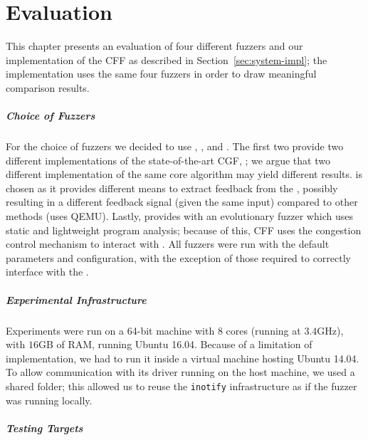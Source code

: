 \chapter{Evaluation}
\label{chap:evaluation}


This chapter presents an evaluation of four different fuzzers and our
implementation of the \acf{CFF} as described in Section~\ref{sec:system-impl};
the implementation uses the same four fuzzers in order to draw meaningful
comparison results.

\paragraph{Choice of Fuzzers}

For the choice of fuzzers we decided to use \aflfast, \fairfuzz, \honggfuzz\@
and \vuzzer. The first two provide two different implementations of the
state-of-the-art \ac{CGF}, \afl; we argue that two different implementation of
the same core algorithm may yield different results. \honggfuzz\@ is chosen as
it provides different means to extract feedback from the \sut, possibly
resulting in a different feedback signal (given the same input) compared to
other methods (\eg\@ \afl\@ uses QEMU). Lastly, \vuzzer\@ provides with an
evolutionary fuzzer which uses static and lightweight program analysis; because
of this, \ac{CFF} uses the congestion control mechanism to interact with
\vuzzer. All fuzzers were run with the default parameters and configuration,
with the exception of those required to correctly interface with the \sut.

\paragraph{Experimental Infrastructure}

Experiments were run on a 64-bit machine with $8$ cores (running at $3.4$GHz),
with $16$GB of RAM, running Ubuntu 16.04. Because of a limitation of \vuzzer\@
implementation, we had to run it inside a virtual machine hosting Ubuntu 14.04.
To allow communication with its driver running on the host machine, we used a
shared folder; this allowed us to reuse the \texttt{inotify} infrastructure as
if the fuzzer was running locally.

\paragraph{Testing Targets}

